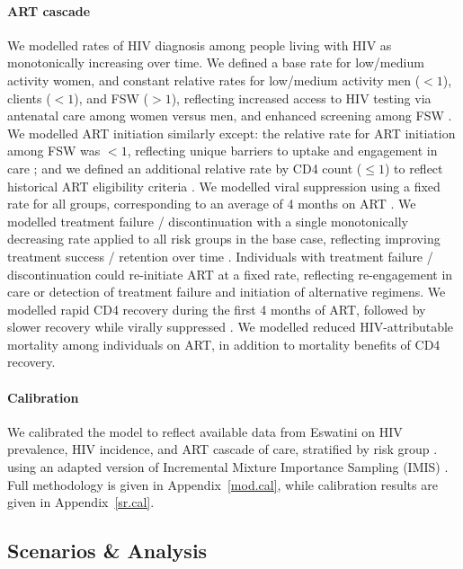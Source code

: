 \paragraph{ART cascade}
We modelled rates of HIV diagnosis among people living with HIV as monotonically increasing over time.
We defined a base rate for low/medium activity women,
and constant relative rates for low/medium activity men ($<1$), clients ($<1$), and FSW ($>1$),
reflecting increased access to HIV testing via antenatal care among women versus men,
and enhanced screening among FSW \cite{Baral2014}.
We modelled ART initiation similarly except:
the relative rate for ART initiation among FSW was $<1$,
reflecting unique barriers to uptake and engagement in care \cite{Mountain2014sr}; and
we defined an additional relative rate by CD4 count ($\le1$)
to reflect historical ART eligibility criteria \cite{NERCHA2018rep}.
We modelled viral suppression using a fixed rate for all groups,
corresponding to an average of 4 months on ART \cite{Mujugira2016}.
We modelled treatment failure / discontinuation with a single monotonically decreasing rate
applied to all risk groups in the base case,
reflecting improving treatment success / retention over time \cite{NERCHA2014nsf}.
Individuals with treatment failure / discontinuation could re-initiate ART at a fixed rate,
reflecting re-engagement in care or detection of treatment failure and initiation of alternative regimens.
We modelled rapid CD4 recovery during the first 4 months of ART,
followed by slower recovery while virally suppressed \cite{Battegay2006,Lawn2006,Gabillard2013}.
We modelled reduced HIV-attributable mortality among individuals on ART,
in addition to mortality benefits of CD4 recovery.
\paragraph{Calibration}
We calibrated the model to reflect
available data from Eswatini on HIV prevalence, HIV incidence, and ART cascade of care,
stratified by risk group \cite{SDHS2006,SHIMS1,SHIMS2,SHIMS3,Baral2014,EswKP2014}.
using an adapted version of Incremental Mixture Importance Sampling (IMIS) \cite{Raftery2010}.
Full methodology is given in Appendix~\ref{mod.cal},
while calibration results are given in Appendix~\ref{sr.cal}.
\subsection{Scenarios \& Analysis}\label{meth.obj}
